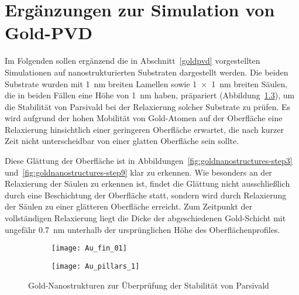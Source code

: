 \chapter{Ergänzungen zur Simulation von Gold-PVD}

Im Folgenden sollen ergänzend die in Abschnitt~\ref{goldpvd} vorgestellten Simulationen auf nanostrukturierten Substraten dargestellt werden.
Die beiden Substrate wurden mit \SI{1}{\nano\meter} breiten Lamellen sowie \SI{1x1}{\nano\meter} breiten Säulen, die in beiden Fällen eine Höhe von \SI{1}{\nano\meter} haben, präpariert (Abbildung~\ref{fig:goldnanostructures}), um die Stabilität von Parsivald bei der Relaxierung solcher Substrate zu prüfen.
Es wird aufgrund der hohen Mobilität von Gold-Atomen auf der Oberfläche eine Relaxierung hinsichtlich einer geringeren Oberfläche erwartet, die nach kurzer Zeit nicht unterscheidbar von einer glatten Oberfläche sein sollte.

Diese Glättung der Oberfläche ist in Abbildungen~\ref{fig:goldnanostructures-step3} und~\ref{fig:goldnanostructures-step9} klar zu erkennen.
Wie besonders an der Relaxierung der Säulen zu erkennen ist, findet die Glättung nicht ausschließlich durch eine Beschichtung der Oberfläche statt, sondern wird durch Relaxierung der Säulen zu einer glätteren Oberfläche erreicht.
Zum Zeitpunkt der vollständigen Relaxierung liegt die Dicke der abgeschiedenen Gold-Schicht mit ungefähr \SI{0.7}{\nano\meter} unterhalb der ursprünglichen Höhe des Oberflächenprofiles.

\vspace{3em}

\begin{figure}[!h]
  \captionsetup[subfigure]{singlelinecheck=false}
  \def\subfigwidth{0.49\textwidth}

  \begin{subfigure}[t]{\subfigwidth}
    \texttt{[image: Au\_fin\_01]}
    \label{fig:goldnanostructures-fins}
  \end{subfigure}
  \hfill
  \begin{subfigure}[t]{\subfigwidth}
    \texttt{[image: Au\_pillars\_1]}
    \label{fig:goldnanostructures-columns}
  \end{subfigure}

  \caption{Gold-Nanostrukturen zur Überprüfung der Stabilität von Parsivald}
  \label{fig:goldnanostructures}

\end{figure}


